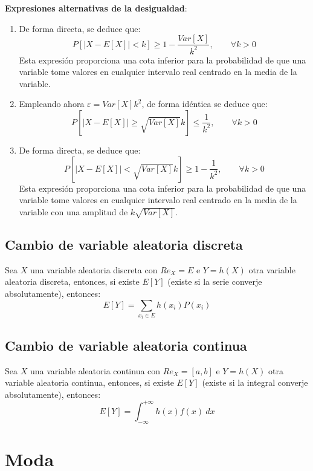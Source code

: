 \textbf{Expresiones alternativas de la desigualdad}:
\begin{enumerate}
    \item De forma directa, se deduce que:
    \begin{equation*}
        P[|X-E[X]| < k]\geq 1-\frac{Var[X]}{k^2},\qquad \forall k>0
    \end{equation*}
    Esta expresión proporciona una cota inferior para la probabilidad de que una variable tome valores en cualquier intervalo real centrado en la media de la variable.

    \item Empleando ahora $\varepsilon=Var[X]k^2$, de forma idéntica se deduce que:
    \begin{equation*}
        P[|X-E[X]|\geq \sqrt{Var[X]}k]\leq \frac{1}{k^2},\qquad \forall k>0
    \end{equation*}

    \item De forma directa, se deduce que:
    \begin{equation*}
        P[|X-E[X]|< \sqrt{Var[X]}k]\geq 1-\frac{1}{k^2},\qquad \forall k>0
    \end{equation*}
    Esta expresión proporciona una cota inferior para la probabilidad de que una variable tome valores en cualquier intervalo real centrado en la media de la variable con una amplitud de $k\sqrt{Var[X]}$.
\end{enumerate}

\subsection{Cambio de variable aleatoria discreta}

Sea $X$ una variable aleatoria discreta con $Re_X=E$ e $Y=h(X)$ otra variable aleatoria discreta, entonces,
si existe $E[Y]$ (existe si la serie converje absolutamente), entonces:
$$E[Y] = \sum_{x_i \in E}h(x_i)P(x_i)$$

\subsection{Cambio de variable aleatoria continua}

Sea $X$ una variable aleatoria continua con $Re_X=[a,b]$ e $Y=h(X)$ otra variable aleatoria continua, entonces,
si existe $E[Y]$ (existe si la integral converje absolutamente), entonces:
$$E[Y] = \int_{-\infty}^{+\infty} h(x)f(x)~dx$$

\section{Moda}

